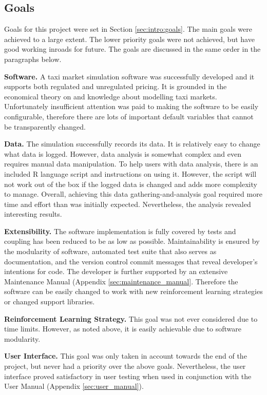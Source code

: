\subsection{Goals}

Goals for this project were set in Section \ref{sec:intro:goals}. The main
goals were achieved to a large extent. The lower priority goals were not
achieved, but have good working inroads for future. The goals are discussed in the same order in the paragraphs below.

\textbf{Software.} A taxi market simulation software was successfully developed
and it supports both regulated and unregulated pricing. It is grounded in the
economical theory on  and knowledge about modelling taxi markets. Unfortunately
insufficient attention was paid to making the software to be easily
configurable, therefore there are lots of important default variables that
cannot be transparently changed.

\textbf{Data.} The simulation successfully records its data. It is
relatively easy to change what data is logged. However, data analysis is
somewhat complex and even requires manual data manipulation. To help users with
data analysis, there is an included R language script and instructions on using
it. However, the script will not work out of the box if the logged data is
changed and adds more complexity to manage. Overall, achieving this data
gathering-and-analysis goal required more time and effort than was initially
expected. Nevertheless, the analysis revealed interesting results.

\textbf{Extensibility.} The software implementation is fully covered by tests
and coupling has been reduced to be as low as possible. Maintainability is
ensured by the modularity of software, automated test suite that also serves as
documentation, and the version control commit messages that reveal developer's
intentions for code. The developer is further supported by an extensive
Maintenance Manual (Appendix \ref{sec:maintenance_manual}. Therefore the
software can be easily changed to work with new reinforcement learning
strategies or changed support libraries.

\textbf{Reinforcement Learning Strategy.} This goal was not ever considered due
to time limits. However, as noted above, it is easily achievable due to
software modularity.

\textbf{User Interface.} This goal was only taken in account towards the end of
the project, but never had a priority over the above goals. Nevertheless, the
user interface proved satisfactory in user testing when used in conjunction
with the User Manual (Appendix \ref{sec:user_manual}).


